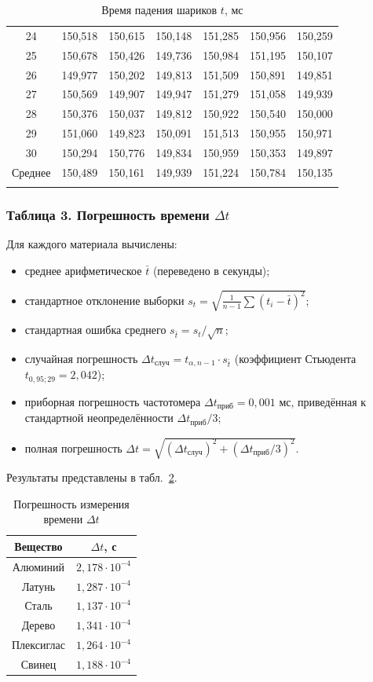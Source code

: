{\begin{longtable}{|c|c|c|c|c|c|c|}
24 & 150,518 & 150,615 & 150,148 & 151,285 & 150,956 & 150,259 \\
25 & 150,678 & 150,426 & 149,736 & 150,984 & 151,195 & 150,107 \\
26 & 149,977 & 150,202 & 149,813 & 151,509 & 150,891 & 149,851 \\
27 & 150,569 & 149,907 & 149,947 & 151,279 & 151,058 & 149,939 \\
28 & 150,376 & 150,037 & 149,812 & 150,922 & 150,540 & 150,000 \\
29 & 151,060 & 149,823 & 150,091 & 151,513 & 150,955 & 150,971 \\
30 & 150,294 & 150,776 & 149,834 & 150,959 & 150,353 & 149,897 \\
\hline
Среднее & 150,489 & 150,161 & 149,939 & 151,224 & 150,784 & 150,135 \\
\hline
\caption{Время падения шариков $t$, мс}
\label{tab:rawtime}
\end{longtable}
}

\subsubsection{Таблица 3. Погрешность времени $\Delta t$}
Для каждого материала вычислены:
\begin{itemize}
    \item среднее арифметическое $\bar{t}$ (переведено в секунды);
    \item стандартное отклонение выборки $s_t = \sqrt{\frac{1}{n-1}\sum (t_i-\bar{t})^2}$;
    \item стандартная ошибка среднего $s_{\bar{t}} = s_t/\sqrt{n}$;
    \item случайная погрешность $\Delta t_{\text{случ}} = t_{\alpha,n-1}\cdot s_{\bar{t}}$ (коэффициент Стьюдента $t_{0,95;29}=2,042$);
    \item приборная погрешность частотомера $\Delta t_{\text{приб}} = 0,001$ мс, приведённая к стандартной неопределённости $\Delta t_{\text{приб}}/3$;
    \item полная погрешность $\Delta t = \sqrt{(\Delta t_{\text{случ}})^2 + (\Delta t_{\text{приб}}/3)^2}$.
\end{itemize}
Результаты представлены в табл.~\ref{tab:deltat}.

\begin{table}[ht!]
\centering
\caption{Погрешность измерения времени $\Delta t$}
\label{tab:deltat}
\begin{tabular}{|c|c|}
\hline
Вещество & $\Delta t$, с \\
\hline
Алюминий   & $2,178\cdot10^{-4}$ \\
Латунь     & $1,287\cdot10^{-4}$ \\
Сталь      & $1,137\cdot10^{-4}$ \\
Дерево     & $1,341\cdot10^{-4}$ \\
Плексиглас & $1,264\cdot10^{-4}$ \\
Свинец     & $1,188\cdot10^{-4}$ \\
\hline
\end{tabular}
\end{table}

